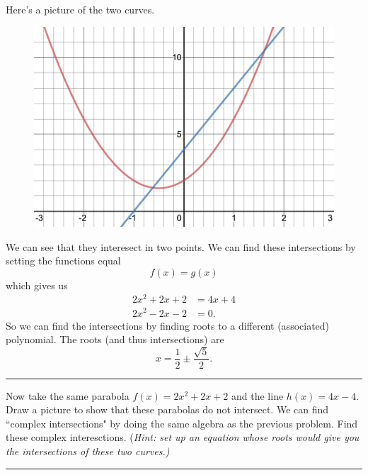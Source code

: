 \documentclass[12pt]{article} %
\begin{document}
\begin{solution}
Here's a picture of the two curves.
\begin{figure}[H]
    \centering
    \includegraphics[width=.8\textwidth]{desmos-graph.png}
\end{figure}
We can see that they interesect in two points. We can find these intersections by setting the functions equal
\[
f(x)=g(x)
\]
which gives us
\begin{align*}
    2x^2+2x+2&=4x+4\\
    2x^2-2x-2&=0.
\end{align*}
So we can find the intersections by finding roots to a different (associated) polynomial. The roots (and thus intersections) are
\[
x=\frac{1}{2}\pm \frac{\sqrt{5}}{2}.
\]
\end{solution}

\hrule

\begin{problem}
    Now take the same parabola $f(x)=2x^2+2x+2$ and the line $h(x)=4x-4$. Draw a picture to show that these parabolas do not intersect. We can find ``complex intersections" by doing the same algebra as the previous problem. Find these complex interesctions. (\emph{Hint: set up an equation whose roots would give you the intersections of these two curves.)}
\end{problem}

\hrule
\end{document}
